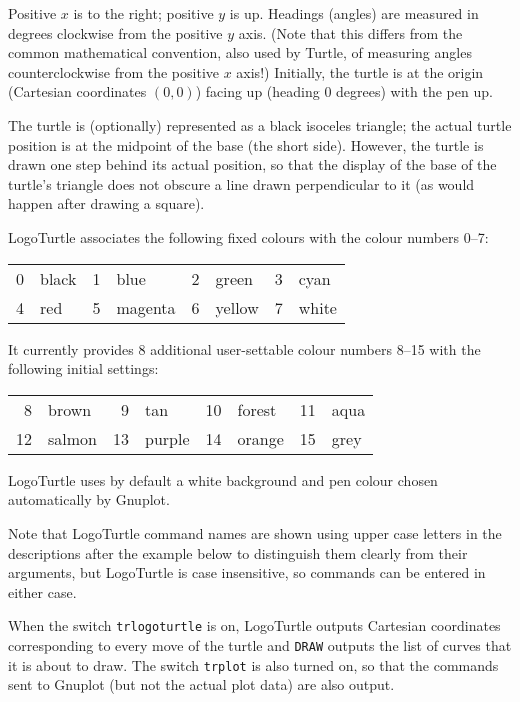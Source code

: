 Positive $x$ is to the right; positive $y$ is up.  Headings (angles)
are measured in degrees clockwise from the positive $y$ axis.  (Note
that this differs from the common mathematical convention, also used
by Turtle, of measuring angles counterclockwise from the positive $x$
axis!)  Initially, the turtle is at the origin (Cartesian coordinates
$(0,0)$) facing up (heading 0 degrees) with the pen up.

The turtle is (optionally) represented as a black isoceles triangle;
the actual turtle position is at the midpoint of the base (the short
side).  However, the turtle is drawn one step behind its actual
position, so that the display of the base of the turtle's triangle
does not obscure a line drawn perpendicular to it (as would happen
after drawing a square).

LogoTurtle associates the following fixed colours with the colour
numbers 0--7:
\begin{center}
  \begin{tabular}{rlrlrlrl}
    0 & black  &  1 & blue    &  2 & green  &  3 & cyan  \\
    4 & red    &  5 & magenta &  6 & yellow &  7 & white
  \end{tabular}
\end{center}
It currently provides 8 additional user-settable colour numbers 8--15
with the following initial settings:
\begin{center}
  \begin{tabular}{rlrlrlrl}
     8 & brown  &  9 & tan     & 10 & forest & 11 & aqua  \\
    12 & salmon & 13 & purple  & 14 & orange & 15 & grey
  \end{tabular}
\end{center}LogoTurtle uses by default a white background and pen colour chosen
automatically by Gnuplot.

Note that LogoTurtle command names are shown using upper case letters
in the descriptions after the example below to distinguish them
clearly from their arguments, but LogoTurtle is case insensitive, so
commands can be entered in either case.

When the switch \texttt{trlogoturtle} is on, LogoTurtle outputs
Cartesian coordinates corresponding to every move of the turtle and
\texttt{DRAW} outputs the list of curves that it is about to draw.
The switch \texttt{trplot} is also turned on, so that the commands
sent to Gnuplot (but not the actual plot data) are also output.


